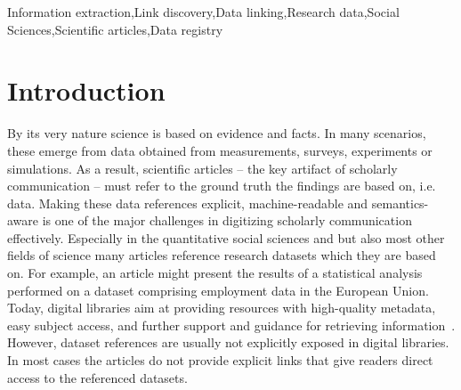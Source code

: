 \documentclass{IOS-Book-Article}
\begin{document}
\begin{frontmatter}
\begin{abstract}
\end{abstract}

\begin{keyword}
Information extraction\sep Link discovery\sep Data linking\sep Research data\sep Social Sciences\sep Scientific articles\sep Data registry
\end{keyword}
\end{frontmatter}
\section{Introduction}
By its very nature science is based on evidence and facts.
In many scenarios, these emerge from data obtained from measurements, surveys, experiments or simulations.
As a result, scientific articles -- the key artifact of scholarly communication -- must refer to the ground truth the findings are based on, i.e. data.
Making these data references explicit, machine-readable and semantics-aware is one of the major challenges in digitizing scholarly communication effectively.
Especially in the quantitative social sciences and but also most other fields of science many articles reference research datasets which they are based on.
For example, an article might present the results of a statistical analysis performed on a dataset comprising employment data in the European Union.
Today, digital libraries aim at providing resources with high-quality metadata, easy subject access, and further support and guidance for retrieving information~\citep{Hienert2015}. 
However, dataset references are usually not explicitly exposed in digital libraries.
In most cases the articles do not provide explicit links that give readers direct access to the referenced datasets. 
\end{document}
